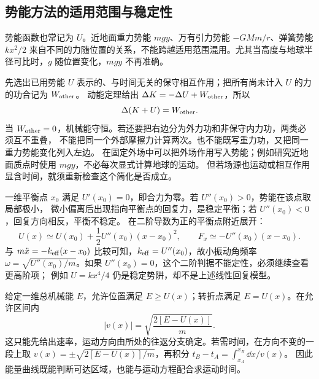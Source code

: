 \subsection{势能方法的适用范围与稳定性}

势能函数也常记为 $U$。近地面重力势能 $mgy$、万有引力势能 $-GMm/r$、弹簧势能 $kx^2/2$
来自不同的力随位置的关系，不能跨越适用范围混用。尤其当高度与地球半径可比时，$g$ 随位置变化，$mgy$ 不再准确。

先选出已用势能 $U$ 表示的、与时间无关的保守相互作用；把所有尚未计入 $U$ 的力的功合记为 $W_{\rm other}$。
动能定理给出 $\Delta K=-\Delta U+W_{\rm other}$，所以
\begin{equation}
 \Delta(K+U)=W_{\rm other}.
 \label{ch08:eq:other-work}
\end{equation}
当 $W_{\rm other}=0$，机械能守恒。若还要把右边分为外力功和非保守内力功，两类必须互不重叠，
不能把同一个外部摩擦力计算两次。也不能既写重力功，又把同一重力势能变化列入左边。
在固定外场中可以把外场作用写入势能；例如研究近地面质点时使用 $mgy$，不必每次显式计算地球的运动。
但若场源也运动或相互作用显含时间，就须重新检查这个简化是否成立。

一维平衡点 $x_0$ 满足 $U'(x_0)=0$，即合力为零。若 $U''(x_0)>0$，势能在该点取局部极小，
微小偏离后出现指向平衡点的回复力，是稳定平衡；若 $U''(x_0)<0$，回复方向相反，平衡不稳定。
在二阶导数为正的平衡点附近展开：
\[
 U(x)\simeq U(x_0)+\frac12U''(x_0)(x-x_0)^2,
 \qquad F_x\simeq-U''(x_0)(x-x_0).
\]
与 $m\ddot x=-k_{\rm eff}(x-x_0)$ 比较可知，$k_{\rm eff}=U''(x_0)$，故小振动角频率
$\omega=\sqrt{U''(x_0)/m}$。如果 $U''(x_0)=0$，这个二阶判据不能定性，必须继续查看更高阶项；
例如 $U=kx^4/4$ 仍是稳定势阱，却不是上述线性回复模型。

给定一维总机械能 $E$，允许位置满足 $E\ge U(x)$；转折点满足 $E=U(x)$。在允许区间内
\[
 |v(x)|=\sqrt{\frac{2[E-U(x)]}{m}}.
\]
这只能先给出速率，运动方向由所处的往返分支确定。若需时间，在方向不变的一段上取
$v(x)=\pm\sqrt{2[E-U(x)]/m}$，再积分 $t_B-t_A=\int_{x_A}^{x_B}\dd x/v(x)$。
因此能量曲线既能判断可达区域，也能与运动方程配合求运动时间。

